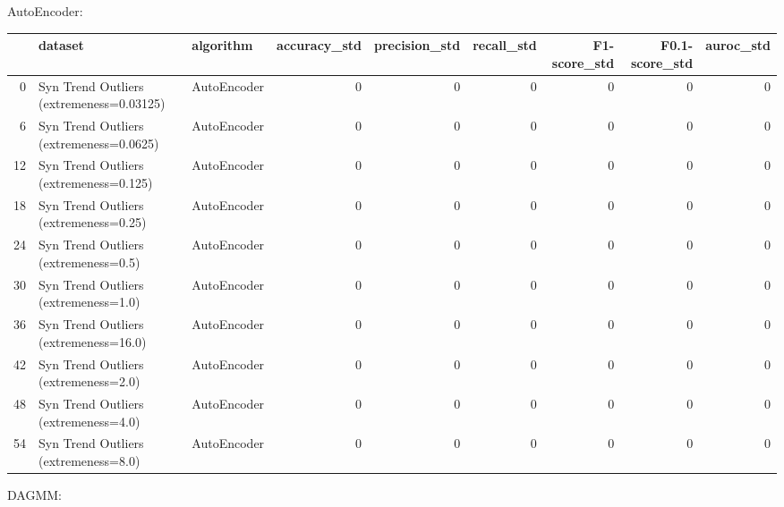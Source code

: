 AutoEncoder:

\begin{tabular}{rllrrrrrr}
\hline
    & dataset                                  & algorithm   &   accuracy\_std &   precision\_std &   recall\_std &   F1-score\_std &   F0.1-score\_std &   auroc\_std \\
\hline
  0 & Syn Trend Outliers (extremeness=0.03125) & AutoEncoder &              0 &               0 &            0 &              0 &                0 &           0 \\
  6 & Syn Trend Outliers (extremeness=0.0625)  & AutoEncoder &              0 &               0 &            0 &              0 &                0 &           0 \\
 12 & Syn Trend Outliers (extremeness=0.125)   & AutoEncoder &              0 &               0 &            0 &              0 &                0 &           0 \\
 18 & Syn Trend Outliers (extremeness=0.25)    & AutoEncoder &              0 &               0 &            0 &              0 &                0 &           0 \\
 24 & Syn Trend Outliers (extremeness=0.5)     & AutoEncoder &              0 &               0 &            0 &              0 &                0 &           0 \\
 30 & Syn Trend Outliers (extremeness=1.0)     & AutoEncoder &              0 &               0 &            0 &              0 &                0 &           0 \\
 36 & Syn Trend Outliers (extremeness=16.0)    & AutoEncoder &              0 &               0 &            0 &              0 &                0 &           0 \\
 42 & Syn Trend Outliers (extremeness=2.0)     & AutoEncoder &              0 &               0 &            0 &              0 &                0 &           0 \\
 48 & Syn Trend Outliers (extremeness=4.0)     & AutoEncoder &              0 &               0 &            0 &              0 &                0 &           0 \\
 54 & Syn Trend Outliers (extremeness=8.0)     & AutoEncoder &              0 &               0 &            0 &              0 &                0 &           0 \\
\hline
\end{tabular}

DAGMM:

